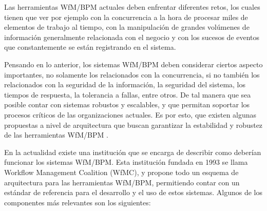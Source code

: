 Las herramientas WfM/BPM actuales deben enfrentar diferentes retos, los cuales tienen que ver por ejemplo con la concurrencia a la hora de procesar miles de elementos de trabajo al tiempo, con la manipulación de grandes volúmenes de información generalmente relacionada con el negocio y con los sucesos de eventos que constantemente se están registrando en el sistema. 

Pensando en lo anterior, los sistemas WfM/BPM deben considerar ciertos aspecto importantes, no solamente los relacionados con la concurrencia, si no también los relacionados con la seguridad de la información, la seguridad del sistema, los tiempos de respuesta, la tolerancia a fallas, entre otros. De tal manera que sea posible contar con sistemas robustos y escalables, y que permitan soportar los procesos críticos de las organizaciones actuales. Es por esto, que existen algunas propuestas a nivel de arquitectura que buscan garantizar la estabilidad y robustez de las herramientas WfM/BPM \cite{VanderAalst2013}. 

En la actualidad existe una institución que se encarga de describir como deberían funcionar los sistemas WfM/BPM. Esta institución fundada en 1993 se llama Workflow Management Coalition (WfMC), y propone todo un esquema de arquitectura para las herramientas WfM/BPM, permitiendo contar con un estándar de referencia para el desarrollo y el uso de estos sistemas. Algunos de los componentes más relevantes son los siguientes: 

